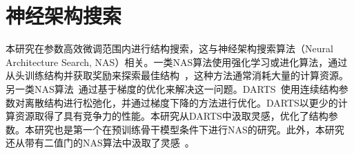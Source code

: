 \section{神经架构搜索} 

本研究在参数高效微调范围内进行结构搜索，这与神经架构搜索算法（Neural Architecture Search, NAS）相关。一类NAS算法使用强化学习或进化算法，通过从头训练结构并获取奖励来探索最佳结构~\cite{zoph2016neural, zoph2018learning,real2019regularized,pham2018efficient}，这种方法通常消耗大量的计算资源。另一类NAS算法~\cite{liu2018darts, liang2019darts+, chen2019progressive}通过基于梯度的优化来解决这一问题。DARTS~\cite{liu2018darts}使用连续结构参数对离散结构进行松弛化，并通过梯度下降的方法进行优化。DARTS以更少的计算资源取得了具有竞争力的性能。本研究从DARTS中汲取灵感，优化了结构参数。本研究也是第一个在预训练骨干模型条件下进行NAS的研究。此外，本研究还从带有二值门的NAS算法中汲取了灵感~\cite{cai2018proxylessnas, wu2019fbnet}。


